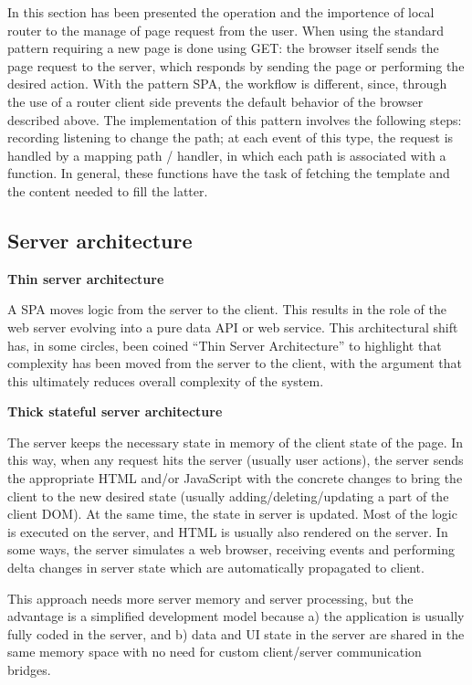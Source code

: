 In this section has been presented the operation and the importence of local router to the manage of page request from the user.
When using the standard pattern requiring a new page is done using GET: the browser itself sends the page request to the server, which responds by sending the page or performing the desired action.
With the pattern SPA, the workflow is different, since, through the use of a router client side prevents the default behavior of the browser described above.
The implementation of this pattern involves the following steps: recording listening to change the path; at each event of this type, the request is handled by a mapping path / handler, in which each path is associated with a function. In general, these functions have the task of fetching the template and the content needed to fill the latter.

\subsection{Server architecture}

\textbf{Thin server architecture}

A SPA moves logic from the server to the client. This results in the role of the web server evolving into a pure data API or web service. This architectural shift has, in some circles, been coined ``Thin Server Architecture'' to highlight that complexity has been moved from the server to the client, with the argument that this ultimately reduces overall complexity of the system.

\textbf{Thick stateful server architecture}

The server keeps the necessary state in memory of the client state of the page. In this way, when any request hits the server (usually user actions), the server sends the appropriate HTML and/or JavaScript with the concrete changes to bring the client to the new desired state (usually adding/deleting/updating a part of the client DOM). At the same time, the state in server is updated. Most of the logic is executed on the server, and HTML is usually also rendered on the server. In some ways, the server simulates a web browser, receiving events and performing delta changes in server state which are automatically propagated to client.

This approach needs more server memory and server processing, but the advantage is a simplified development model because a) the application is usually fully coded in the server, and b) data and UI state in the server are shared in the same memory space with no need for custom client/server communication bridges.

